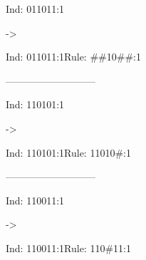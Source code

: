 \documentclass[12pt,openright,twoside,letterpaper,english,brazil,sumario=tradicional]{abntex2}
\begin{document}
\begin{flushleft}\ttfamily
\par Ind: 011011:1\end{flushleft} -> \begin{flushleft}\ttfamily
\par Ind: 011011:1Rule: \textcolor[cmy]{0.81623,0.48781,0.85583,}{\#\#10\#\#:1}
\end{flushleft}---------------------------

\begin{flushleft}\ttfamily
\par Ind: 110101:1\end{flushleft} -> \begin{flushleft}\ttfamily
\par Ind: 110101:1Rule: \textcolor[cmy]{0.656842,0.0207149,0.337039,}{11010\#:1}
\end{flushleft}---------------------------

\begin{flushleft}\ttfamily
\par Ind: 110011:1\end{flushleft} -> \begin{flushleft}\ttfamily
\par Ind: 110011:1Rule: \textcolor[cmy]{0.251202,0.718679,0.393992,}{110\#11:1}
\end{flushleft}
\end{document}
